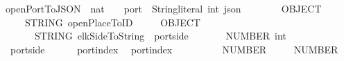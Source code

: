 \isamarkupfalse%
\ openPortToJSON\ {\isacharcolon}{\isacharcolon}\ {\isachardoublequoteopen}nat\ {\isasymRightarrow}\ {\isacharparenleft}\ \ port\ {\isasymRightarrow}\ {\isacharparenleft}String{\isachardot}literal{\isacharcomma}\ int{\isacharparenright}\ json{\isachardoublequoteclose}\isanewline
\ \ \ {\isachardoublequoteopen}\ \ {\isacharequal}\isanewline
\ \ OBJECT\ {\isacharbrackleft}\isanewline
\ \ \ \ {\isacharparenleft}\ STRING\ {\isacharparenleft}openPlaceToID\ \isanewline
\ \ {\isacharcomma}\ {\isacharparenleft}\ OBJECT\ {\isacharbrackleft}\isanewline
\ \ \ \ \ \ {\isacharparenleft}\ STRING\ {\isacharparenleft}elkSideToString\ {\isacharparenleft}\ {\isacharparenleft}port{\isachardot}side\ \isanewline
\ \ \ \ {\isacharcomma}\ {\isacharparenleft}\ NUMBER\ {\isacharparenleft}int\ {\isacharparenleft}\isanewline
{}\ \ {\isacharparenleft}port{\isachardot}side\ \ {\isasymin}\ \isanewline
{}\ \ {\isacharminus}\ port{\isachardot}index\ \isanewline
{}\ port{\isachardot}index\ \isanewline
\ \ \ \ {\isacharbrackright}{\isacharparenright}\isanewline
\ \ {\isacharcomma}\ {\isacharparenleft}\ NUMBER\ {}{}{\isacharparenright}\isanewline
\ \ {\isacharcomma}\ {\isacharparenleft}\ NUMBER\ {}{}{\isacharparenright}{\isacharbrackright}{\isachardoublequoteclose}

